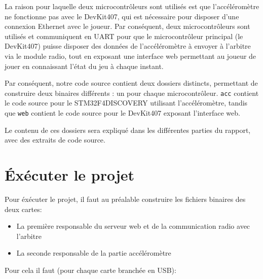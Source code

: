 \documentclass[12pt,french]{article}
\begin{document}
La raison pour laquelle deux microcontrôleurs sont utilisés est que l'accéléromètre ne fonctionne pas avec le DevKit407, qui est nécessaire pour disposer d'une connexion Ethernet avec le joueur. Par conséquent, deux microcontrôleurs sont utilisés et communiquent en UART pour que le microcontrôleur principal (le DevKit407) puisse disposer des données de l'accéléromètre à envoyer à l'arbitre via le module radio, tout en exposant une interface web permettant au joueur de jouer en connaissant l'état du jeu à chaque instant.

Par conséquent, notre code source contient deux dossiers distincts, permettant de construire deux binaires différents : un pour chaque microcontrôleur. \texttt{acc} contient le code source pour le STM32F4DISCOVERY utilisant l'accéléromètre, tandis que \texttt{web} contient le code source pour le DevKit407 exposant l'interface web.

Le contenu de ces dossiers sera expliqué dans les différentes parties du rapport, avec des extraits de code source.

\section{Éxécuter le projet}

Pour éxécuter le projet, il faut au préalable construire les fichiers binaires des deux cartes:

\begin{itemize}
    \item La première responsable du serveur web et de la communication radio avec l'arbitre
    \item La seconde responsable de la partie accéléromètre
\end{itemize}

Pour cela il faut (pour chaque carte branchée en USB):
\end{document}
